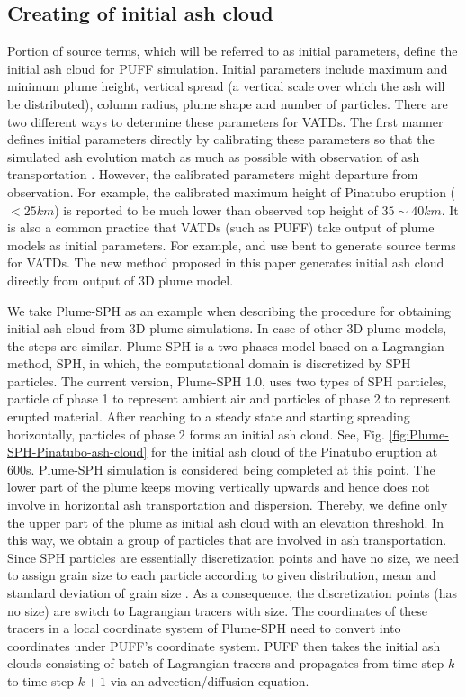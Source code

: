 \subsection{Creating of initial ash cloud}

Portion of source terms, which will be referred to as initial parameters, define the initial ash cloud for PUFF simulation. Initial parameters include maximum and minimum plume height, vertical spread (a vertical scale over which the ash will be distributed), column radius, plume shape and number of particles. There are two different ways to determine these parameters for VATDs. The first manner defines initial parameters directly by calibrating these parameters so that the simulated ash evolution match as much as possible with observation of ash transportation \citep[e.g.][]{fero2008simulation,fero2009simulating}. However, the calibrated parameters might departure from observation. For example, the calibrated maximum height of Pinatubo eruption ($<25 km$) is reported to be much lower \citep{fero2009simulating} than observed top height of $35 \sim 40 km$. It is also a common practice that VATDs (such as PUFF) take output of plume models as initial parameters. For example, \citet{bursik2012estimation} and \citet{ stefanescu2014temporal} use bent \citep{bursik2001effect} to generate source terms for VATDs. The new method proposed in this paper generates initial ash cloud directly from output of 3D plume model.

We take Plume-SPH as an example when describing the procedure for obtaining initial ash cloud from 3D plume simulations. In case of other 3D plume models, the steps are similar. Plume-SPH is a two phases model based on a Lagrangian method, SPH, in which, the computational domain is discretized by SPH particles. The current version, Plume-SPH 1.0, uses two types of SPH particles, particle of phase 1 to represent ambient air and particles of phase 2 to represent erupted material. After reaching to a steady state and starting spreading horizontally, particles of phase 2 forms an initial ash cloud. See, Fig. \ref{fig:Plume-SPH-Pinatubo-ash-cloud} for the initial ash cloud of the Pinatubo eruption at 600s. Plume-SPH simulation is considered being completed at this point. The lower part of the plume keeps moving vertically upwards and hence does not involve in horizontal ash transportation and dispersion. Thereby, we define only the upper part of the plume as initial ash cloud with an elevation threshold. In this way, we obtain a group of particles that are involved in ash transportation. Since SPH particles are essentially discretization points and have no size, we need to assign grain size to each particle according to given distribution, mean and standard deviation of grain size \citep{paladio1996tephra}. As a consequence, the discretization points (has no size) are switch to Lagrangian tracers with size. The coordinates of these tracers in a local coordinate system of Plume-SPH need to convert into coordinates under PUFF's coordinate system. PUFF then takes the initial ash clouds consisting of batch of Lagrangian tracers and propagates from time step $k$ to time step $k+1$ via an advection/diffusion equation.

